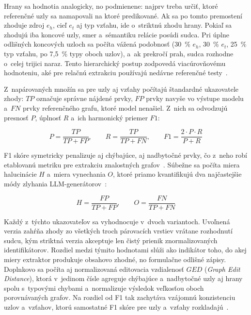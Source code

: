Hrany sa hodnotia analogicky, no podmienene: najprv treba určiť, ktoré referenčné uzly sa namapovali na ktoré predikované. Ak sa po tomto premostení zhoduje zdroj $e_h$, cieľ $e_t$ aj typ vzťahu, ide o~striktnú zhodu hrany. Pokiaľ sa zhodujú iba koncové uzly, smer a~sémantiku relácie posúdi sudca. Pri úplne odlišných koncových uzloch sa počíta vážená podobnosť (30~\% $e_h$, 30~\% $e_t$, 25~\% typ vzťahu, po 7{,}5~\% typy oboch uzlov), a~ak prekročí prah, sudca rozhodne o~celej trijici naraz. Tento hierarchický postup zodpovedá viacúrovňovému hodnoteniu, aké pre relačnú extrakciu používajú nedávne referenčné testy~\cite{brokman2025zsre, castedo2026blinkg}.

Z~napárovaných množín sa pre uzly aj vzťahy počítajú štandardné ukazovatele zhody: $TP$ označuje správne nájdené prvky, $FP$ prvky navyše vo výstupe modelu a~$FN$ prvky referenčného grafu, ktoré model nenašiel. Z~nich sa odvodzujú presnosť $P$, úplnosť $R$ a~ich harmonický priemer $F1$:

\begin{equation}\label{eq:prf}
P = \frac{TP}{TP + FP}, \qquad R = \frac{TP}{TP + FN}, \qquad F1 = \frac{2 \cdot P \cdot R}{P + R}
\end{equation}

F1 skóre symetricky penalizuje aj chýbajúce, aj nadbytočné prvky, čo z~neho robí etablovanú metriku pre extrakciu znalostných grafov~\cite{ghanem2025kgeval, brokman2025zsre}. Súbežne sa počíta miera halucinácie $H$ a~miera vynechania $O$, ktoré priamo kvantifikujú dva najčastejšie módy zlyhania LLM-generátorov~\cite{ghanem2025kgeval}:

\begin{equation}\label{eq:halluc-omission}
H = \frac{FP}{TP + FP}, \qquad O = \frac{FN}{TP + FN}
\end{equation}

Každý z~týchto ukazovateľov sa vyhodnocuje v~dvoch variantoch. Uvoľnená verzia zahŕňa zhody zo všetkých troch párovacích vrstiev vrátane rozhodnutí sudcu, kým striktná verzia akceptuje len čistý prienik znormalizovaných identifikátorov. Rozdiel medzi týmito hodnotami slúži ako indikátor toho, do akej miery extraktor produkuje obsahovo zhodné, no formulačne odlišné zápisy. Doplnkovo sa počíta aj normalizovaná editovacia vzdialenosť $GED$ (\textit{Graph Edit Distance}), ktorá v~jedinom čísle agreguje chýbajúce a~nadbytočné uzly aj hrany spolu s~typovými chybami a~normalizuje výsledok veľkosťou oboch porovnávaných grafov. Na rozdiel od F1 tak zachytáva vzájomnú konzistenciu uzlov a~vzťahov, ktorú samostatné F1 skóre pre uzly a~vzťahy rozkladajú~\cite{ghanem2025kgeval}.

